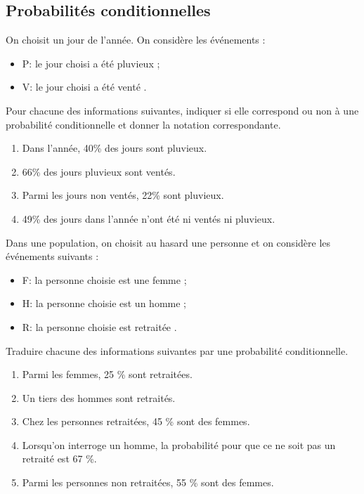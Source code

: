 \documentclass[french]{book}
\begin{document}
\subsection{Probabilités conditionnelles}
\begin{exocor}
On choisit un jour de l’année. On considère les événements :

\begin{itemize}
\item P: \og  le jour choisi a été pluvieux \fg{} ;
\item V: \og le jour choisi a été venté \fg{} .
\end{itemize}

Pour chacune des informations suivantes, indiquer si elle
correspond ou non à une probabilité conditionnelle et donner la notation correspondante.

\begin{enumerate}
\item Dans l’année, 40\% des jours sont pluvieux.
\item 66\% des jours pluvieux sont ventés.
\item Parmi les jours non ventés, 22\% sont pluvieux.
\item 49\% des jours dans l’année n’ont été ni ventés ni pluvieux.
\end{enumerate}
\end{exocor}

\begin{exocor}
Dans une population, on choisit au hasard une personne
et on considère les événements suivants :

\begin{itemize}
\item F: \og la personne choisie est une femme \fg{} ;
\item H: \og la personne choisie est un homme \fg{} ;
\item R: \og la personne choisie est retraitée \fg{}.
\end{itemize}

Traduire chacune des informations suivantes par une probabilité conditionnelle.

\begin{enumerate}
\item Parmi les femmes, 25 \% sont retraitées.
\item Un tiers des hommes sont retraités.
\item Chez les personnes retraitées, 45 \% sont des femmes.
\item Lorsqu’on interroge un homme, la probabilité pour que ce ne soit pas un retraité est 67 \%.
\item Parmi les personnes non retraitées, 55 \% sont des
femmes.
\end{enumerate}
\end{exocor}
\end{document}
